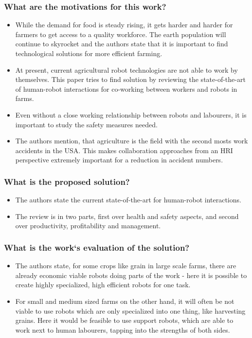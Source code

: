 \documentclass{article}
\begin{document}
\subsubsection*{What are the motivations for this work?}
\begin{itemize}
    \item While the demand for food is steady rising, it gets harder and harder for farmers to get access to a quality workforce. The earth population will continue to skyrocket and the authors state that it is important to find technological solutions for more efficient farming.
    \item At present, current agricultural robot technologies are not able to work by themselves. This paper tries to find solution by reviewing the state-of-the-art of human-robot interactions for co-working between workers and robots in farms.
    \item Even without a close working relationship between robots and labourers, it is important to study the safety measures needed. 
    \item The authors mention, that agriculture is the field with the second mosts work accidents in the USA. This makes collaboration approaches from an HRI perspective extremely important for a reduction in accident numbers.
\end{itemize}
\subsubsection*{What is the proposed solution?}
\begin{itemize}
    \item The authors state the current state-of-the-art for human-robot interactions.
    \item The review is in two parts, first over health and safety aspects, and second over productivity, profitability and management.
\end{itemize}
\subsubsection*{What is the work`s evaluation of the solution?}
\begin{itemize}
    \item The authors state, for some crops like grain in large scale farms, there are already economic viable robots doing parts of the work - here it is possible to create highly specialized, high efficient robots for one task.
    \item For small and medium sized farms on the other hand, it will often be not viable to use robots which are only specialized into one thing, like harvesting grains. Here it would be feasible to use support robots, which are able to work next to human labourers, tapping into the strengths of both sides.
\end{itemize}
\end{document}
